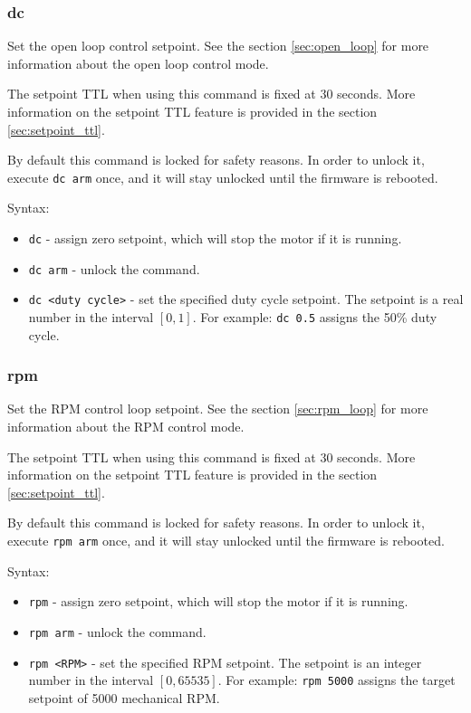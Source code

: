 \documentclass{zubaxdoc}
\begin{document}
\subsubsection{dc}

Set the open loop control setpoint.
See the section \ref{sec:open_loop} for more information about the open loop control mode.

The setpoint TTL when using this command is fixed at 30 seconds.
More information on the setpoint TTL feature is provided in the section \ref{sec:setpoint_ttl}.

By default this command is locked for safety reasons.
In order to unlock it, execute \verb|dc arm| once, and it will stay unlocked until the firmware is rebooted.

Syntax:
\begin{itemize}
\item \verb|dc| - assign zero setpoint, which will stop the motor if it is running.
\item \verb|dc arm| - unlock the command.
\item \verb|dc <duty cycle>| - set the specified duty cycle setpoint.
The setpoint is a real number in the interval $\left[0, 1\right]$.
For example: \verb|dc 0.5| assigns the 50\% duty cycle.
\end{itemize}

\subsubsection{rpm}

Set the RPM control loop setpoint.
See the section \ref{sec:rpm_loop} for more information about the RPM control mode.

The setpoint TTL when using this command is fixed at 30 seconds.
More information on the setpoint TTL feature is provided in the section \ref{sec:setpoint_ttl}.

By default this command is locked for safety reasons.
In order to unlock it, execute \verb|rpm arm| once, and it will stay unlocked until the firmware is rebooted.

Syntax:
\begin{itemize}
\item \verb|rpm| - assign zero setpoint, which will stop the motor if it is running.
\item \verb|rpm arm| - unlock the command.
\item \verb|rpm <RPM>| - set the specified RPM setpoint.
The setpoint is an integer number in the interval $\left[0, 65535\right]$.
For example: \verb|rpm 5000| assigns the target setpoint of 5000 mechanical RPM.
\end{itemize}
\end{document}
